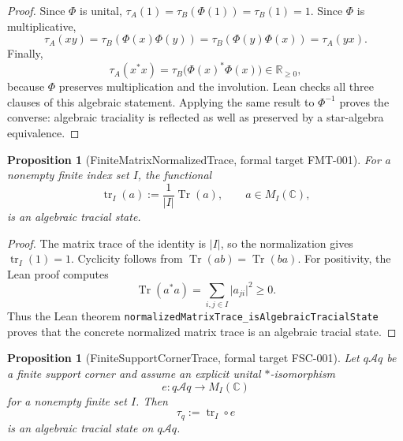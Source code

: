 \documentclass{article}
\newtheorem{proposition}[definition]{Proposition}
\newcommand{\cA}{\mathcal A}
\begin{document}
\begin{proof}
Since \(\Phi\) is unital,
\(\tau_A(1)=\tau_B(\Phi(1))=\tau_B(1)=1\).  Since \(\Phi\) is
multiplicative,
\begin{equation*}
 \tau_A(xy)=\tau_B(\Phi(x)\Phi(y))
 =\tau_B(\Phi(y)\Phi(x))=\tau_A(yx).
\end{equation*}
Finally,
\begin{equation*}
  \tau_A(x^*x)=\tau_B\bigl(\Phi(x)^*\Phi(x)\bigr)\in\mathbb R_{\geq0},
\end{equation*}
because \(\Phi\) preserves multiplication and the involution.  Lean checks
all three clauses of this algebraic statement.  Applying the same result to
\(\Phi^{-1}\) proves the converse: algebraic traciality is reflected as well
as preserved by a star-algebra equivalence.
\end{proof}

\begin{proposition}[FiniteMatrixNormalizedTrace, formal target FMT-001]
For a nonempty finite index set \(I\), the functional
\begin{equation*}
  \operatorname{tr}_I(a)
  :=\frac{1}{|I|}\operatorname{Tr}(a),
  \qquad a\in M_I(\mathbb C),
\end{equation*}
is an algebraic tracial state.
\end{proposition}

\begin{proof}
The matrix trace of the identity is \(|I|\), so the normalization gives
\(\operatorname{tr}_I(1)=1\).  Cyclicity follows from
\(\operatorname{Tr}(ab)=\operatorname{Tr}(ba)\).  For positivity, the Lean
proof computes
\begin{equation*}
  \operatorname{Tr}(a^*a)=\sum_{i,j\in I}\lvert a_{ji}\rvert^2\geq0.
\end{equation*}
Thus the Lean theorem
\texttt{normalizedMatrixTrace\_isAlgebraicTracialState} proves that the
concrete normalized matrix trace is an algebraic tracial state.
\end{proof}

\begin{proposition}[FiniteSupportCornerTrace, formal target FSC-001]
Let \(q\cA q\) be a finite support corner and assume an explicit unital
\(*\)-isomorphism
\begin{equation*}
  e:q\cA q\longrightarrow M_I(\mathbb C)
\end{equation*}
for a nonempty finite set \(I\).  Then
\begin{equation*}
  \tau_q:=\operatorname{tr}_I\circ e
\end{equation*}
is an algebraic tracial state on \(q\cA q\).
\end{proposition}
\end{document}
